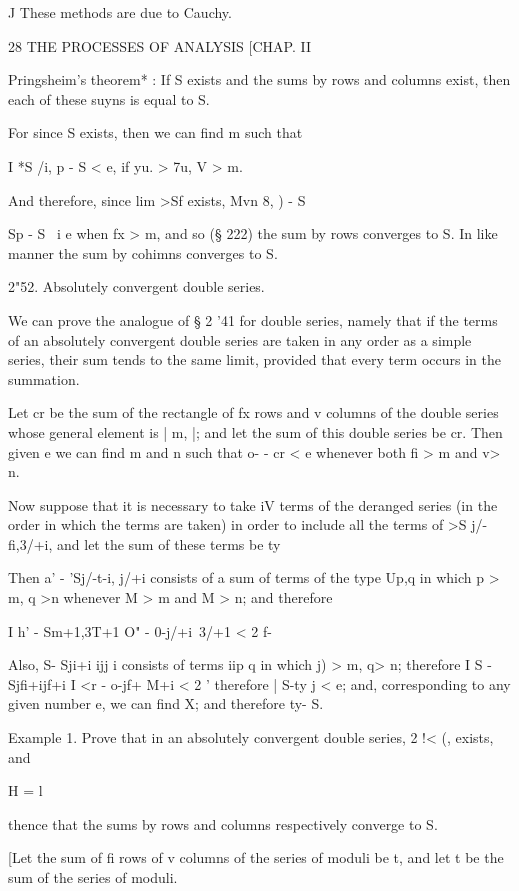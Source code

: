 J These methods are due to Cauchy.



28 THE PROCESSES OF ANALYSIS [CHAP. II

Pringsheim's theorem* : If S exists and the sums by rows and columns
exist, then each of these suyns is equal to S.

For since S exists, then we can find m such that

I *S /i, p - S < e, if yu. > 7u, V > m.

And therefore, since lim >Sf exists, Mvn 8, ) - S %

  Sp - S \ i e when fx > m, and so (§ 222) the sum by rows converges
to S. In like manner the sum by cohimns converges to S.

2"52. Absolutely convergent double series.

We can prove the analogue of § 2 '41 for double series, namely that if
the terms of an absolutely convergent double series are taken in any
order as a simple series, their sum tends to the same limit, provided
that every term occurs in the summation.

Let cr be the sum of the rectangle of fx rows and v columns of the
double series whose general element is | m, |; and let the sum of
this double series be cr. Then given e we can find m and n such that
o- - cr < e whenever both fi > m and v> n.

Now suppose that it is necessary to take iV terms of the deranged
series (in the order in which the terms are taken) in order to include
all the terms of >S j/-fi,3/+i, and let the sum of these terms be ty

Then a' - 'Sj/-t-i, j/+i consists of a sum of terms of the type Up,q
in which p > m, q >n whenever M > m and M > n; and therefore

I h' - Sm+1,3T+1 O" - 0-j/+i\ 3/+1 < 2 f-

Also, S- Sji+i ijj i consists of terms iip q in which j) > m, q> n;
therefore I S - Sjfi+ijf+i I <r - o-jf+ M+i < 2 ' therefore | S-ty j <
e; and, corresponding to any given number e, we can find X; and
therefore ty- S.

Example 1. Prove that in an absolutely convergent double series, 2 !<
(, exists, and

H = l

thence that the sums by rows and columns respectively converge to S.

[Let the sum of fi rows of v columns of the series of moduli be t,
and let t be the sum of the series of moduli.

